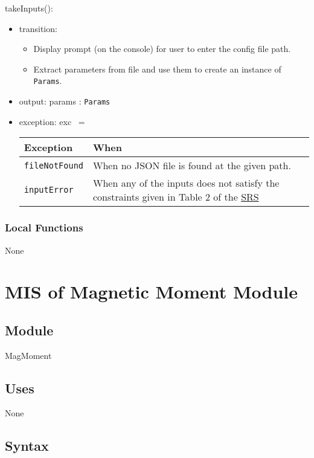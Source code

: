 \documentclass[12pt, titlepage]{article}
\begin{document}
\noindent takeInputs():
\begin{itemize}
\item transition: 
\begin{itemize}
  \item Display prompt (on the console) for user to enter the config file path. 
  \item Extract parameters from file and use them to create an instance of \texttt{Params}.
\end{itemize} 
\item output: params : \texttt{Params} 
\item exception: exc $\:=$
\begin{center}
  \begin{tabular}{p{5cm} p{4cm}}
  \hline
  \textbf{Exception} & \textbf{When} \\
  \hline
  \texttt{fileNotFound} & When no JSON file is found at the given path.  \\
  \hline
  \texttt{inputError} & When any of the inputs does not satisfy the constraints given in Table 2 of the \href{https://github.com/husseinsd1/optimal-em-arrangement/blob/main/docs/SRS/SRS.pdf}{SRS}  \\
  \hline
  \end{tabular}
  \end{center}
\end{itemize}

\subsubsection{Local Functions}
None

\newpage


\section{MIS of Magnetic Moment Module} \label{MISMagMoment}
\subsection{Module}
MagMoment

\subsection{Uses}
None

\subsection{Syntax}
\end{document}
